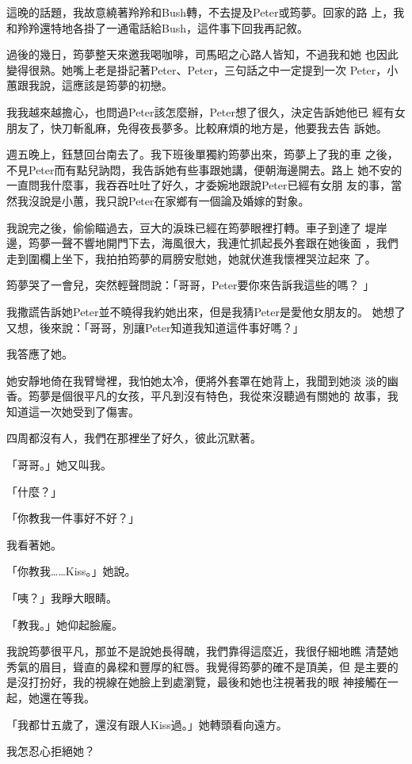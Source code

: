 這晚的話題，我故意繞著羚羚和Bush轉，不去提及Peter或筠夢。回家的路
上，我和羚羚還特地各掛了一通電話給Bush，這件事下回我再記敘。

過後的幾日，筠夢整天來邀我喝咖啡，司馬昭之心路人皆知，不過我和她
也因此變得很熟。她嘴上老是掛記著Peter、Peter，三句話之中一定提到一次
Peter，小蕙跟我說，這應該是筠夢的初戀。

我我越來越擔心，也問過Peter該怎麼辦，Peter想了很久，決定告訴她他已
經有女朋友了，快刀斬亂麻，免得夜長夢多。比較麻煩的地方是，他要我去告
訴她。

週五晚上，鈺慧回台南去了。我下班後單獨約筠夢出來，筠夢上了我的車
之後，不見Peter而有點兒訥悶，我告訴她有些事跟她講，便朝海邊開去。路上
她不安的一直問我什麼事，我吞吞吐吐了好久，才委婉地跟說Peter已經有女朋
友的事，當然我沒說是小蕙，我只說Peter在家鄉有一個論及婚嫁的對象。

我說完之後，偷偷瞄過去，豆大的淚珠已經在筠夢眼裡打轉。車子到達了
堤岸邊，筠夢一聲不響地開門下去，海風很大，我連忙抓起長外套跟在她後面
，我們走到圍欄上坐下，我拍拍筠夢的肩膀安慰她，她就伏進我懷裡哭泣起來
了。

筠夢哭了一會兒，突然輕聲問說：「哥哥，Peter要你來告訴我這些的嗎？
」

我撒謊告訴她Peter並不曉得我約她出來，但是我猜Peter是愛他女朋友的。
她想了又想，後來說：「哥哥，別讓Peter知道我知道這件事好嗎？」

我答應了她。

她安靜地倚在我臂彎裡，我怕她太冷，便將外套罩在她背上，我聞到她淡
淡的幽香。筠夢是個很平凡的女孩，平凡到沒有特色，我從來沒聽過有關她的
故事，我知道這一次她受到了傷害。

四周都沒有人，我們在那裡坐了好久，彼此沉默著。

「哥哥。」她又叫我。

「什麼？」

「你教我一件事好不好？」

我看著她。

「你教我……Kiss。」她說。

「咦？」我睜大眼睛。

「教我。」她仰起臉龐。

我說筠夢很平凡，那並不是說她長得醜，我們靠得這麼近，我很仔細地瞧
清楚她秀氣的眉目，聳直的鼻樑和豐厚的紅唇。我覺得筠夢的確不是頂美，但
是主要的是沒打扮好，我的視線在她臉上到處瀏覽，最後和她也注視著我的眼
神接觸在一起，她還在等我。

「我都廿五歲了，還沒有跟人Kiss過。」她轉頭看向遠方。

我怎忍心拒絕她？

